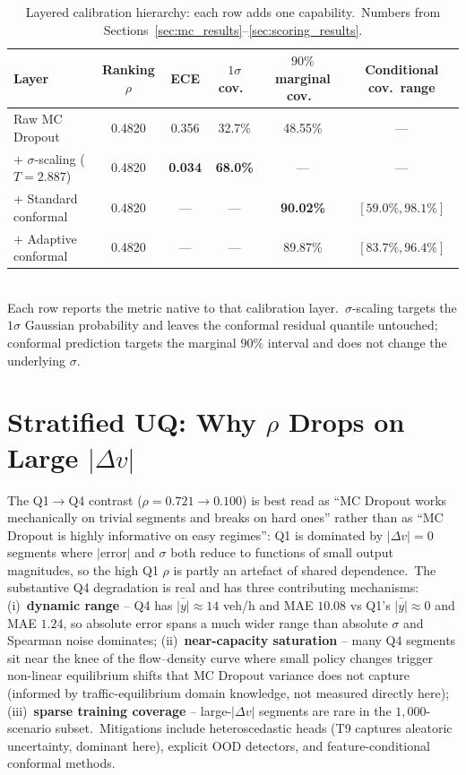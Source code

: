 \begin{table}[htbp]
\centering
\caption[Layered calibration hierarchy]{Layered calibration hierarchy: each row adds one capability.\ Numbers from Sections~\ref{sec:mc_results}--\ref{sec:scoring_results}.}
\label{tab:calibration_hierarchy}
\footnotesize
\setlength{\tabcolsep}{4pt}
\begin{tabular}{lccccc}
\toprule
Layer & Ranking $\rho$ & ECE & $1\sigma$ cov.\ & $90\%$ marginal cov.\ & Conditional cov.\ range \\
\midrule
Raw MC Dropout & 0.4820 & 0.356 & 32.7\% & 48.55\% & --- \\
$+$ $\sigma$-scaling ($T = 2.887$) & 0.4820 & \textbf{0.034} & \textbf{68.0\%} & --- & --- \\
$+$ Standard conformal & 0.4820 & --- & --- & \textbf{90.02\%} & $[59.0\%, 98.1\%]$ \\
$+$ Adaptive conformal & 0.4820 & --- & --- & 89.87\% & $\mathbf{[83.7\%, 96.4\%]}$ \\
\bottomrule
\end{tabular}
\\[0.3em]
\footnotesize Each row reports the metric native to that calibration layer.\ $\sigma$-scaling targets the $1\sigma$ Gaussian probability and leaves the conformal residual quantile untouched; conformal prediction targets the marginal $90\%$ interval and does not change the underlying $\sigma$.
\end{table}

\section{Stratified UQ: Why $\rho$ Drops on Large $|\Delta v|$}\label{sec:stratified_why}

The Q1$\to$Q4 contrast ($\rho = 0.721 \to 0.100$) is best read as ``MC Dropout works mechanically on trivial segments and breaks on hard ones'' rather than as ``MC Dropout is highly informative on easy regimes'': Q1 is dominated by $|\Delta v| = 0$ segments where $|\text{error}|$ and $\sigma$ both reduce to functions of small output magnitudes, so the high Q1 $\rho$ is partly an artefact of shared dependence.\ The substantive Q4 degradation is real and has three contributing mechanisms: (i)~\textbf{dynamic range} -- Q4 has $\bar{|y|} \approx 14$ veh/h and MAE $10.08$ vs Q1's $\bar{|y|} \approx 0$ and MAE $1.24$, so absolute error spans a much wider range than absolute $\sigma$ and Spearman noise dominates; (ii)~\textbf{near-capacity saturation} -- many Q4 segments sit near the knee of the flow--density curve where small policy changes trigger non-linear equilibrium shifts that MC Dropout variance does not capture (informed by traffic-equilibrium domain knowledge, not measured directly here); (iii)~\textbf{sparse training coverage} -- large-$|\Delta v|$ segments are rare in the $1{,}000$-scenario subset.\ Mitigations include heteroscedastic heads (T9 captures aleatoric uncertainty, dominant here), explicit OOD detectors, and feature-conditional conformal methods.

